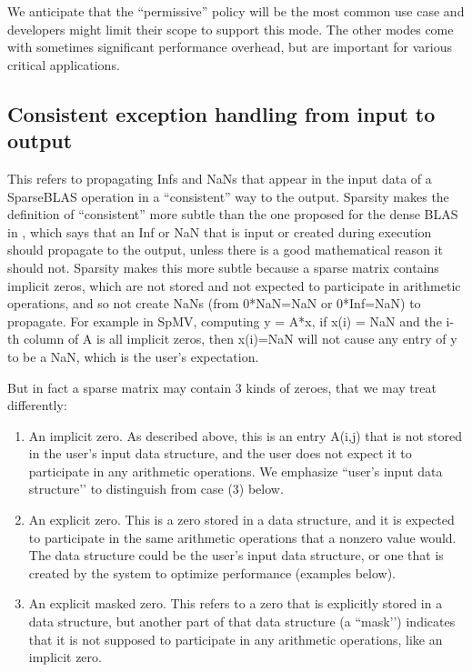 \documentclass{article}
\begin{document}
We anticipate that the ``permissive'' policy will be the most common use case and developers might limit their scope to support this mode. The other modes come with sometimes significant performance overhead, but are important for various critical applications.

\fi

\subsection{Consistent exception handling from
input to output}

This refers to propagating Infs and NaNs that appear in the input data of a SparseBLAS
operation in a “consistent” way to the output. Sparsity makes the definition of “consistent”
more subtle than the one proposed for the dense BLAS in \cite{Proposed_BLAS_LAPACK_exception_handling}, which says that an Inf or NaN
that is input or created during execution should propagate to the output, unless there
is a good mathematical reason it should not. Sparsity makes this more subtle because
a sparse matrix contains implicit zeros, which are not stored and not expected to participate in
arithmetic operations, and so not create NaNs (from 0*NaN=NaN or 0*Inf=NaN) to
propagate. For example in SpMV, computing y = A*x, if x(i) = NaN and the i-th column
of A is all implicit zeros, then x(i)=NaN will not cause any entry of y to be a NaN, which
is the user’s expectation. 

But in fact a sparse matrix may contain 3 kinds of zeroes, that we may treat differently:
\begin{enumerate}
\item An implicit zero. As described above, this is an entry A(i,j) that is not stored in the 
user’s input data structure, and the user does not expect it to participate in any
arithmetic operations. We emphasize ``user’s input data structure’’ to distinguish
from case (3) below.
\item An explicit zero. This is a zero stored in a data structure, and it is
expected to participate in the same arithmetic operations that a nonzero value would.
The data structure could be the user’s input data structure, or one that is created by
the system to optimize performance (examples below).
\item An explicit masked zero. This refers to a zero that is explicitly stored in a data structure,
but another part of that data structure (a ``mask’’) indicates that it is not supposed to
participate in any arithmetic operations, like an implicit zero. 
\end{enumerate}
\end{document}
